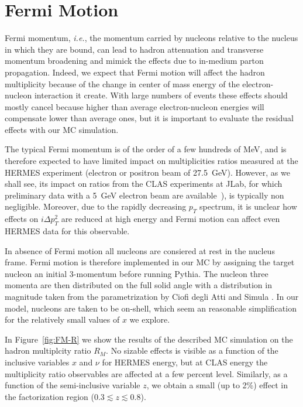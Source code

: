 \section{Fermi Motion}

Fermi momentum, {\em i.e.}, the momentum carried by nucleons relative to the nucleus in which they are bound, can lead to hadron attenuation and transverse momentum broadening and mimick the effects due to in-medium parton propagation.
Indeed, we expect that Fermi motion will affect the hadron multiplicity because of the change in center of mass energy of the electron-nucleon interaction it create. 
With large numbers of events these effects should mostly cancel because higher than average electron-nucleon energies will compensate lower than average ones, but it is important to evaluate the residual effects with our MC simulation. 

The typical Fermi momentum is of the order of a few hundreds of MeV, and is therefore expected to have limited impact on multiplicities ratios measured at the HERMES experiment (electron or positron beam of 27.5~GeV). However, as we shall see, its impact on ratios from the CLAS experiments at JLab, for which preliminary data with a 5~GeV electron beam are available~\cite{Brooks:2009xg,DupreQNP}), is typically non negligible. 
Moreover, due to the rapidly decreasing $p_T$ spectrum, it is unclear how effects on $i\Delta p_T^2$ are reduced at high energy and Fermi motion can affect even HERMES data for this observable.

In absence of Fermi motion all nucleons are consiered at rest in the nucleus frame. 
Fermi motion is therefore implemented in our MC by assigning the target nucleon an initial 3-momentum before running Pythia. The nucleon three momenta are then distributed on the full solid angle with a distribution in magnitude taken from the parametrization by Ciofi degli Atti and Simula \cite{CiofidegliAtti:1995qe}.
In our model, nucleons are taken to be on-shell, which seem an reasonable simplification for the relatively small values of $x$ we explore.

In Figure~\ref{fig:FM-R} we show the results of the described MC simulation on the hadron multiplcity ratio $R_M$. No sizable effects is visible as a function of the inclusive variables $x$ and $\nu$ for HERMES energy, but at CLAS energy the multiplicity ratio observables are affected at a few percent level. Similarly, as a function of the semi-inclusive variable $z$, we obtain a small (up to 2\%) effect in the factorization region ($0.3 \lesssim z \lesssim0.8$). 

